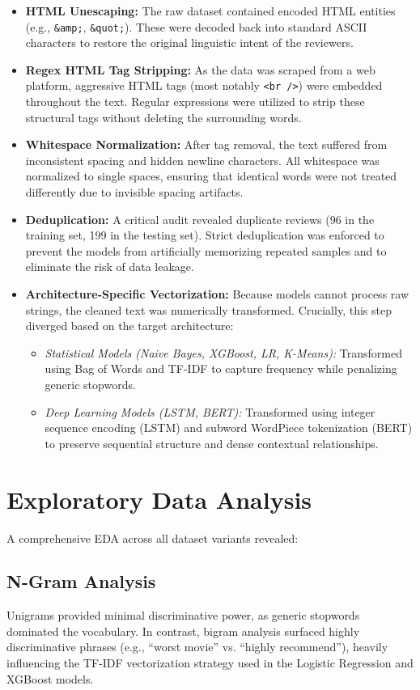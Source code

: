 \documentclass[12pt]{article}
\begin{document}
\begin{itemize}
    \item \textbf{HTML Unescaping:} The raw dataset contained encoded HTML entities (e.g., \texttt{\&amp;}, \texttt{\&quot;}). These were decoded back into standard ASCII characters to restore the original linguistic intent of the reviewers.
    \item \textbf{Regex HTML Tag Stripping:} As the data was scraped from a web platform, aggressive HTML tags (most notably \texttt{<br />}) were embedded throughout the text. Regular expressions were utilized to strip these structural tags without deleting the surrounding words.
    \item \textbf{Whitespace Normalization:} After tag removal, the text suffered from inconsistent spacing and hidden newline characters. All whitespace was normalized to single spaces, ensuring that identical words were not treated differently due to invisible spacing artifacts.
    \item \textbf{Deduplication:} A critical audit revealed duplicate reviews (96 in the training set, 199 in the testing set). Strict deduplication was enforced to prevent the models from artificially memorizing repeated samples and to eliminate the risk of data leakage.
    \item \textbf{Architecture-Specific Vectorization:} Because models cannot process raw strings, the cleaned text was numerically transformed. Crucially, this step diverged based on the target architecture:
    \begin{itemize}
        \item \textit{Statistical Models (Naive Bayes, XGBoost, LR, K-Means):} Transformed using Bag of Words and TF-IDF to capture frequency while penalizing generic stopwords.
        \item \textit{Deep Learning Models (LSTM, BERT):} Transformed using integer sequence encoding (LSTM) and subword WordPiece tokenization (BERT) to preserve sequential structure and dense contextual relationships.
    \end{itemize}
\end{itemize}

\section*{Exploratory Data Analysis}
A comprehensive EDA across all dataset variants revealed:

\subsection*{N-Gram Analysis}
Unigrams provided minimal discriminative power, as generic stopwords dominated the vocabulary. In contrast, bigram analysis surfaced highly discriminative phrases (e.g., ``worst movie'' vs. ``highly recommend''), heavily influencing the TF-IDF vectorization strategy used in the Logistic Regression and XGBoost models.
\end{document}
